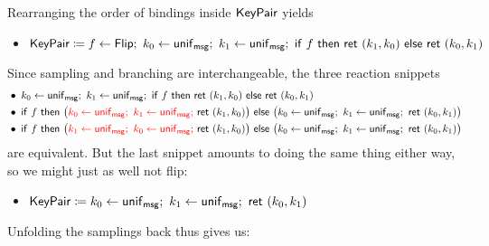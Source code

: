 \noindent Rearranging the order of bindings inside $\mathsf{KeyPair}$ yields
\begin{itemize}
\item $\KeyPair \coloneqq f \leftarrow \Flip; \ k_0 \leftarrow \unif_\msg; \ k_1 \leftarrow \unif_\msg; \ \ifte{f}{\ret{(k_1,k_0)}}{\ret{(k_0,k_1)}}$
\end{itemize}
Since sampling and branching are interchangeable, the three reaction snippets
\begin{align*}
& \bullet \; k_0 \leftarrow \unif_\msg; \ k_1 \leftarrow \unif_\msg; \ \ifte{f}{\ret{(k_1,k_0)}}{\ret{(k_0,k_1)}} \\
& \bullet \; \ifte{f}{\big({\color{red} k_0 \leftarrow \unif_\msg; \ k_1 \leftarrow \unif_\msg;} \ \ret{(k_1,k_0)}\big)}{\big(k_0 \leftarrow \unif_\msg; \ k_1 \leftarrow \unif_\msg; \ \ret{(k_0,k_1)}\big)} \\
& \bullet \; \ifte{f}{\big({\color{red} k_1 \leftarrow \unif_\msg; \ k_0 \leftarrow \unif_\msg;} \ \ret{(k_1,k_0)}\big)}{\big(k_0 \leftarrow \unif_\msg; \ k_1 \leftarrow \unif_\msg; \ \ret{(k_0,k_1)}\big)}
\end{align*}
are equivalent. But the last snippet amounts to doing the same thing either way, so we might just as well not flip:
\begin{itemize}
\item $\KeyPair \coloneqq k_0 \leftarrow \unif_\msg; \ k_1 \leftarrow \unif_\msg; \ \ret{(k_0,k_1)}$
\end{itemize}
Unfolding the samplings back thus gives us:

